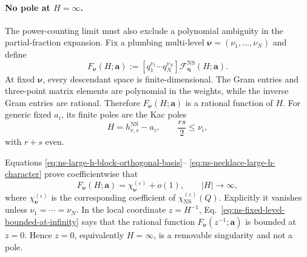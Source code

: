 \documentclass[11pt]{article}
\newcommand{\NS}{\mathrm{NS}}
\newcommand{\F}{\mathcal F}
\begin{document}
\paragraph{No pole at \(H=\infty\).}
The power-counting limit must also exclude a polynomial ambiguity in the
partial-fraction expansion.  Fix a plumbing multi-level
\(\boldsymbol\nu=(\nu_1,\ldots,\nu_N)\) and define
\begin{equation}
 F_{\boldsymbol\nu}(H;\boldsymbol a)
 :=
 \left[
 q_1^{\nu_1}\cdots q_N^{\nu_N}
 \right]
 \F^{\NS}_{\boldsymbol\eta}(H;\boldsymbol a).
 \label{eq:ns-fixed-level-coefficient}
\end{equation}
At fixed \(\boldsymbol\nu\), every descendant space is finite-dimensional.
The Gram entries and three-point matrix elements are polynomial in the
weights, while the inverse Gram entries are rational.  Therefore
\(F_{\boldsymbol\nu}(H;\boldsymbol a)\) is a rational function of \(H\).
For generic fixed \(a_i\), its finite poles are the Kac poles
\begin{equation}
 H=h^{\NS}_{r,s}-a_i,
 \qquad
 \frac{rs}{2}\leq\nu_i ,
 \label{eq:ns-fixed-level-finite-poles}
\end{equation}
with \(r+s\) even.

Equations
\eqref{eq:ns-large-h-block-orthogonal-basis}--%
\eqref{eq:ns-necklace-large-h-character} prove coefficientwise that
\begin{equation}
 F_{\boldsymbol\nu}(H;\boldsymbol a)
 =
 \chi^{(\varepsilon)}_{\boldsymbol\nu}
 + o(1),
 \qquad |H|\longrightarrow\infty ,
 \label{eq:ns-fixed-level-bounded-at-infinity}
\end{equation}
where
\(\chi^{(\varepsilon)}_{\boldsymbol\nu}\) is the corresponding coefficient
of \(\chi^{(\varepsilon)}_{\NS}(Q)\).  Explicitly it vanishes unless
\(\nu_1=\cdots=\nu_N\).  In the local coordinate \(z=H^{-1}\),
Eq.~\eqref{eq:ns-fixed-level-bounded-at-infinity} says that the rational
function \(F_{\boldsymbol\nu}(z^{-1};\boldsymbol a)\) is bounded at \(z=0\).
Hence \(z=0\), equivalently \(H=\infty\), is a removable singularity and
not a pole.
\end{document}
